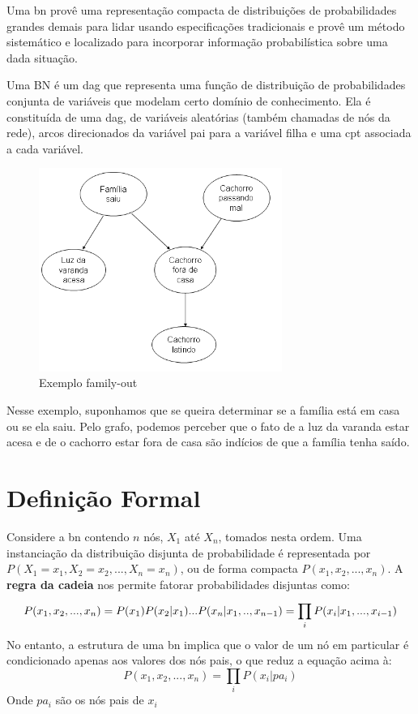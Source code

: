 
Uma \gls{bn} provê uma representação compacta de distribuições de probabilidades grandes demais para lidar usando especificações tradicionais e provê um método sistemático e localizado para incorporar informação probabilística sobre uma dada situação.

Uma BN é um \gls{dag} que representa uma função de distribuição de probabilidades conjunta de variáveis que modelam certo domínio de conhecimento. Ela é constituída de uma \gls{dag}, de variáveis aleatórias (também chamadas de nós da rede), arcos direcionados da variável pai para a variável filha e uma \gls{cpt} associada a cada variável.
\begin{figure}[H]
	\centering
	\includegraphics[width = 300px]{figuras/BN1}
	\caption[Exemplo family-out]{Exemplo family-out}
	\label{fig:familyBN}
\end{figure}

Nesse exemplo, suponhamos que se queira determinar se a família está em casa ou se ela saiu. Pelo grafo, podemos perceber que o fato de a luz da varanda estar acesa e de o cachorro estar fora de casa são indícios de que a família tenha saído. 

\section{Definição Formal}
Considere a \gls{bn} contendo $n$ nós, $X_1$ até $X_n$, tomados nesta ordem. Uma instanciação da distribuição disjunta de probabilidade é representada por $P(X_1 = x_1, X_2 = x_2, ... , X_n = x_n)$, ou de forma compacta $P(x_1, x_2, ..., x_n)$. A \textbf{regra da cadeia} nos permite fatorar probabilidades disjuntas como:
\begin{equation}
	P(x_1, x_2, ..., x_n) = P(x_1)P(x_2|x_1)...P(x_n|x_1,..,x_{n-1})\\
	= \prod_{i}^{}P(x_i|x_1,...,x_{i-1})
\end{equation}
No entanto, a estrutura de uma \gls{bn} implica que o valor de um nó em particular é condicionado apenas aos valores dos nós pais, o que reduz a equação acima à:
\begin{equation}\label{eq:pearl}
P(x_1, x_2, ..., x_n) = \prod_i P(x_i|pa_i)
\end{equation}
Onde $pa_i$ são os nós pais de $x_i$

